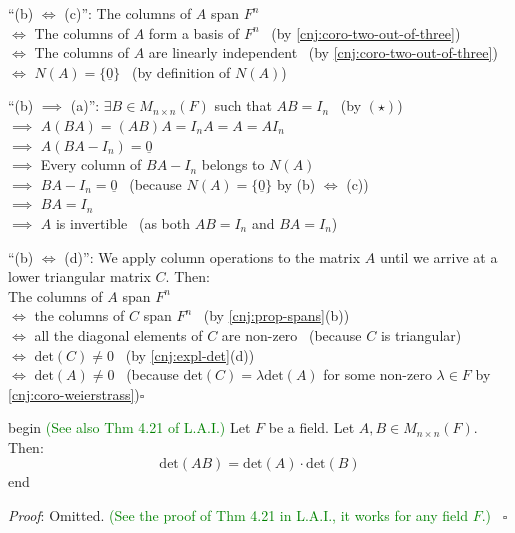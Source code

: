 \documentclass[
  12pt,
  a4paper,
  twoside]{article}
\theoremstyle{plain}
\theoremstyle{definition}
\begin{document}
``(b) \(\iff\) (c)'': The columns of \(A\) span \(F^{n}\)\\
\(\iff\) The columns of \(A\) form a basis of \(F^{n}\) \hfill~{(by \ref{cnj:coro-two-out-of-three})}\\
\(\iff\) The columns of \(A\) are linearly independent \hfill~{(by \ref{cnj:coro-two-out-of-three})}\\
\(\iff\) \(N(A)= \{ \underline{0} \}\) \hfill~{(by definition of \(N(A)\))}

``(b) \(\implies\) (a)'': \(\exists B \in M_{n \times n}(F)\) such that \(AB = I_{n}\) \hfill~{(by \((\star)\))}\\
\(\implies\) \(A(BA) = (AB)A = I_{n}A = A = A I_{n}\)\\
\(\implies\) \(A(BA - I_{n}) = \underline{0}\)\\
\(\implies\) Every column of \(BA - I_{n}\) belongs to \(N(A)\)\\
\(\implies\) \(BA - I_{n} = \underline{0}\) \hfill~{(because \(N(A) = \{ \underline{0} \}\) by (b) \(\iff\) (c))}\\
\(\implies\) \(BA = I_{n}\)\\
\(\implies\) \(A\) is invertible \hfill~{(as both \(AB = I_{n}\) and \(BA = I_{n}\))}

``(b) \(\iff\) (d)'': We apply column operations to the matrix \(A\) until we arrive at a lower triangular matrix \(C\). Then:\\
The columns of \(A\) span \(F^{n}\)\\
\(\iff\) the columns of \(C\) span \(F^{n}\) \hfill~{(by \ref{cnj:prop-spans}(b))}\\
\(\iff\) all the diagonal elements of \(C\) are non-zero \hfill~{(because \(C\) is triangular)}\\
\(\iff\) \(\mathrm{det}(C) \neq 0\) \hfill~{(by \ref{cnj:expl-det}(d))}\\
\(\iff\) \(\mathrm{det}(A) \neq 0\) \hfill~{(because \(\mathrm{det}(C) = \lambda \mathrm{det}(A)\) for some non-zero \(\lambda \in F\) by \ref{cnj:coro-weierstrass})\(\square\)}

\csname begin\label{cnj:thm-detprod}
\textcolor{green}{(See also Thm 4.21 of L.A.I.)}
Let \(F\) be a field. Let \(A, B \in M_{n \times n}(F)\). Then:
\[
\mathrm{det}(AB) = \mathrm{det}(A) \cdot \mathrm{det}(B)
\]
\csname end

\emph{Proof}: Omitted. \textcolor{green}{(See the proof of Thm 4.21 in L.A.I., it works for any field $F$.)}
\hfill~{\(\square\)}
\end{document}
